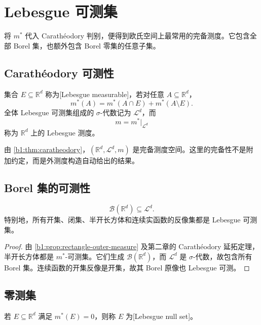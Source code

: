 \section{Lebesgue 可测集}
\label{b1:sec:0302}

将 \(m^*\) 代入 Carathéodory 判别，便得到欧氏空间上最常用的完备测度。它包含全部 Borel 集，也额外包含 Borel 零集的任意子集。

\subsection{Carathéodory 可测性}
\label{b1:subsec:030201}

\begin{definition}
\label{b1:def:lebesgue-measurable}
集合 \(E\subseteq\mathbb R^d\) 称为[Lebesgue measurable]，若对任意 \(A\subseteq\mathbb R^d\)，
\[
m^*(A)=m^*(A\cap E)+m^*(A\setminus E).
\]
全体 Lebesgue 可测集组成的 \(\sigma\)-代数记为 \(\mathcal L^d\)，而
\[
m=m^*|_{\mathcal L^d}
\]
称为 \(\mathbb R^d\) 上的 Lebesgue 测度。
\end{definition}

由 \cref{b1:thm:caratheodory}，\((\mathbb R^d,\mathcal L^d,m)\) 是完备测度空间。这里的完备性不是附加约定，而是外测度构造自动给出的结果。

\subsection{Borel 集的可测性}
\label{b1:subsec:030202}

\begin{theorem}
\label{b1:thm:borel-lebesgue}
\[
\mathcal B(\mathbb R^d)\subseteq\mathcal L^d.
\]
特别地，所有开集、闭集、半开长方体和连续实函数的反像集都是 Lebesgue 可测集。
\end{theorem}
\begin{proof}
由 \cref{b1:prop:rectangle-outer-measure} 及第二章的 Carathéodory 延拓定理，半开长方体都是 \(m^*\)-可测集。它们生成 \(\mathcal B(\mathbb R^d)\)，而 \(\mathcal L^d\) 是 \(\sigma\)-代数，故包含所有 Borel 集。连续函数的开集反像是开集，故其 Borel 原像也 Lebesgue 可测。
\end{proof}

\subsection{零测集}
\label{b1:subsec:030203}

\begin{definition}
\label{b1:def:lebesgue-null}
若 \(E\subseteq\mathbb R^d\) 满足 \(m^*(E)=0\)，则称 \(E\) 为[Lebesgue null set]。
\end{definition}

